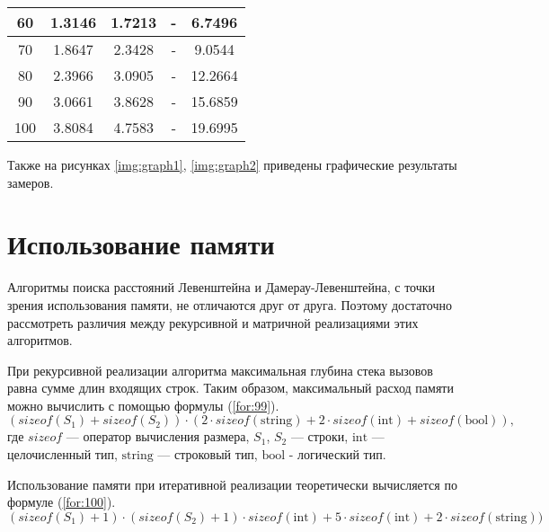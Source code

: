 \begin{table}[h]
\begin{center}
\begin{threeparttable}
\begin{tabular}{|c|c|c|c|c|}
            \hline
            60 & 1.3146 & 1.7213 & - & 6.7496 \\ 
            \hline
            70 & 1.8647 & 2.3428 & - & 9.0544 \\ 
            \hline
            80 & 2.3966 & 3.0905 & - & 12.2664 \\ 
            \hline
            90 & 3.0661 & 3.8628 & - & 15.6859 \\ 
            \hline
            100 & 3.8084 & 4.7583 & - & 19.6995 \\ 
            \hline
		\end{tabular}
    \end{threeparttable}
\end{center}
\end{table}

Также на рисунках \ref{img:graph1}, \ref{img:graph2} приведены графические результаты замеров.

\clearpage


\section{Использование памяти}

Алгоритмы поиска расстояний Левенштейна и Дамерау-Левенштейна, с точки зрения использования памяти, не отличаются друг от друга. Поэтому достаточно рассмотреть различия между рекурсивной и матричной реализациями этих алгоритмов.

При рекурсивной реализации алгоритма максимальная глубина стека вызовов равна сумме длин входящих строк. Таким образом, максимальный расход памяти можно вычислить с помощью формулы (\ref{for:99}).
\begin{equation}
	(sizeof(S_1) + sizeof(S_2)) \cdot (2 \cdot sizeof\mathrm{(string)} + 2 \cdot sizeof\mathrm{(int)} + sizeof\mathrm{(bool)}),
	\label{for:99}
\end{equation}
где $sizeof$ — оператор вычисления размера, $S_1$, $S_2$ — строки, $\mathrm{int}$ — целочисленный тип, $\mathrm{string}$ — строковый тип,  $\mathrm{bool}$ - логический тип.

Использование памяти при итеративной реализации теоретически вычисляется по формуле (\ref{for:100}).
\begin{equation}
	(sizeof(S_1) + 1) \cdot (sizeof(S_2) + 1) \cdot sizeof\mathrm{(int)} + 5\cdot sizeof\mathrm{(int)} + 2 \cdot sizeof\mathrm{(string)})
	\label{for:100}
\end{equation}

